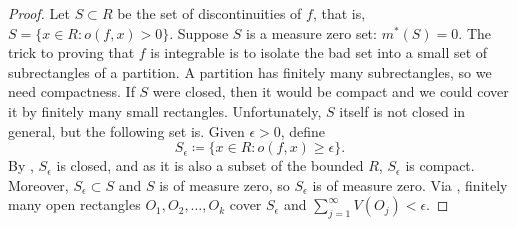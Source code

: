 \begin{proof}
Let $S \subset R$ be the set of discontinuities of $f$, that is,
$S = \bigl\{ x \in R : o(f,x) > 0 \bigr\}$.
Suppose $S$ is a measure zero set: $m^*(S) = 0$.
The trick to proving that $f$ is integrable is to isolate the bad set
into a small set of subrectangles of a partition.  A partition has
finitely many subrectangles, so we need
compactness.  If $S$ were closed, then it would be compact and we could cover
it by finitely many small rectangles.  Unfortunately, $S$
itself is not closed in general, but the following set is.
Given $\epsilon > 0$, define
\begin{equation*}
S_\epsilon \coloneqq \bigl\{ x \in R : o(f,x) \geq \epsilon \bigr\} .
\end{equation*}
By , $S_\epsilon$ is closed,
and as it is also a subset of the bounded $R$,
$S_\epsilon$ is compact.  Moreover,
$S_\epsilon \subset S$ and $S$ is of measure zero,
so $S_\epsilon$ is of measure zero.
Via , finitely many open rectangles
$O_1,O_2,\ldots,O_k$ cover $S_\epsilon$ and
$\sum_{j=1}^\infty V(O_j) < \epsilon$.  


\end{proof}
